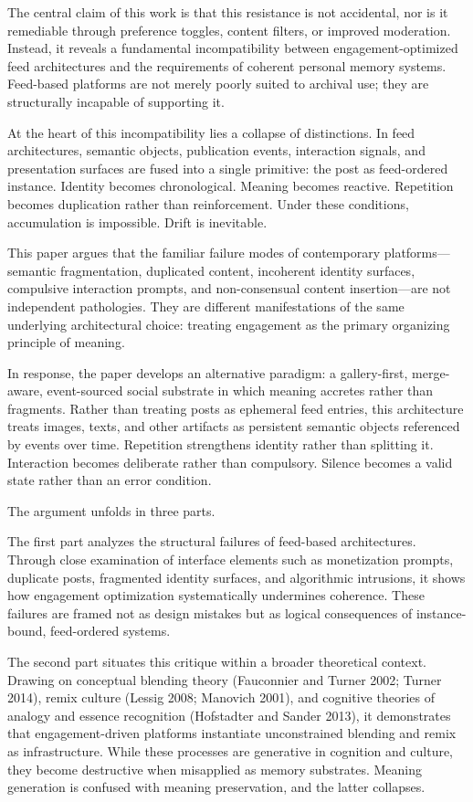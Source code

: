 \documentclass[11pt,oneside]{article}
\begin{document}
The central claim of this work is that this resistance is not accidental, nor is it remediable through preference toggles, content filters, or improved moderation. Instead, it reveals a fundamental incompatibility between engagement-optimized feed architectures and the requirements of coherent personal memory systems. Feed-based platforms are not merely poorly suited to archival use; they are structurally incapable of supporting it.

At the heart of this incompatibility lies a collapse of distinctions. In feed architectures, semantic objects, publication events, interaction signals, and presentation surfaces are fused into a single primitive: the post as feed-ordered instance. Identity becomes chronological. Meaning becomes reactive. Repetition becomes duplication rather than reinforcement. Under these conditions, accumulation is impossible. Drift is inevitable.

This paper argues that the familiar failure modes of contemporary platforms—semantic fragmentation, duplicated content, incoherent identity surfaces, compulsive interaction prompts, and non-consensual content insertion—are not independent pathologies. They are different manifestations of the same underlying architectural choice: treating engagement as the primary organizing principle of meaning.

In response, the paper develops an alternative paradigm: a gallery-first, merge-aware, event-sourced social substrate in which meaning accretes rather than fragments. Rather than treating posts as ephemeral feed entries, this architecture treats images, texts, and other artifacts as persistent semantic objects referenced by events over time. Repetition strengthens identity rather than splitting it. Interaction becomes deliberate rather than compulsory. Silence becomes a valid state rather than an error condition.

The argument unfolds in three parts.

The first part analyzes the structural failures of feed-based architectures. Through close examination of interface elements such as monetization prompts, duplicate posts, fragmented identity surfaces, and algorithmic intrusions, it shows how engagement optimization systematically undermines coherence. These failures are framed not as design mistakes but as logical consequences of instance-bound, feed-ordered systems.

The second part situates this critique within a broader theoretical context. Drawing on conceptual blending theory (Fauconnier and Turner 2002; Turner 2014), remix culture (Lessig 2008; Manovich 2001), and cognitive theories of analogy and essence recognition (Hofstadter and Sander 2013), it demonstrates that engagement-driven platforms instantiate unconstrained blending and remix as infrastructure. While these processes are generative in cognition and culture, they become destructive when misapplied as memory substrates. Meaning generation is confused with meaning preservation, and the latter collapses.
\end{document}

